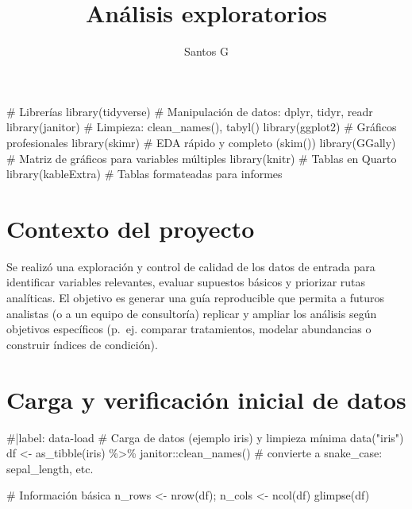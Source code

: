 \documentclass[
  spanish,
  11pt,
  a4paper,
  DIV=11,
  numbers=noendperiod]{scrartcl}
\title{Análisis exploratorios}
\author{Santos G}
\date{}
\newenvironment{Shaded}{\begin{snugshade}}{\end{snugshade}}
\newcommand{\CommentTok}[1]{\textcolor[rgb]{0.37,0.37,0.37}{#1}}
\newcommand{\FunctionTok}[1]{\textcolor[rgb]{0.28,0.35,0.67}{#1}}
\newcommand{\NormalTok}[1]{\textcolor[rgb]{0.00,0.23,0.31}{#1}}
\newcommand{\OtherTok}[1]{\textcolor[rgb]{0.00,0.23,0.31}{#1}}
\newcommand{\SpecialCharTok}[1]{\textcolor[rgb]{0.37,0.37,0.37}{#1}}
\newcommand{\StringTok}[1]{\textcolor[rgb]{0.13,0.47,0.30}{#1}}
\renewcommand*\contentsname{Tabla de contenidos}
\newcommand\contentsname{Tabla de contenidos}
\begin{document}
\maketitle

\renewcommand*\contentsname{Tabla de contenidos}
{
\hypersetup{linkcolor=}
\setcounter{tocdepth}{2}
\tableofcontents
}

\begin{Shaded}
\begin{Highlighting}[numbers=left,,]
\CommentTok{\# Librerías }
\FunctionTok{library}\NormalTok{(tidyverse)   }\CommentTok{\# Manipulación de datos: dplyr, tidyr, readr}
\FunctionTok{library}\NormalTok{(janitor)     }\CommentTok{\# Limpieza: clean\_names(), tabyl()}
\FunctionTok{library}\NormalTok{(ggplot2)     }\CommentTok{\# Gráficos profesionales}
\FunctionTok{library}\NormalTok{(skimr)       }\CommentTok{\# EDA rápido y completo (skim())}
\FunctionTok{library}\NormalTok{(GGally)      }\CommentTok{\# Matriz de gráficos para variables múltiples}
\FunctionTok{library}\NormalTok{(knitr)       }\CommentTok{\# Tablas en Quarto}
\FunctionTok{library}\NormalTok{(kableExtra)  }\CommentTok{\# Tablas formateadas para informes}
\end{Highlighting}
\end{Shaded}

\section{Contexto del proyecto}\label{contexto-del-proyecto}

Se realizó una exploración y control de calidad de los datos de entrada
para identificar variables relevantes, evaluar supuestos básicos y
priorizar rutas analíticas. El objetivo es generar una guía reproducible
que permita a futuros analistas (o a un equipo de consultoría) replicar
y ampliar los análisis según objetivos específicos (p.~ej. comparar
tratamientos, modelar abundancias o construir índices de condición).

\section{Carga y verificación inicial de
datos}\label{carga-y-verificaciuxf3n-inicial-de-datos}

\begin{Shaded}
\begin{Highlighting}[numbers=left,,]
\CommentTok{\#|label: data{-}load}
\CommentTok{\# Carga de datos (ejemplo iris) y limpieza mínima}
\FunctionTok{data}\NormalTok{(}\StringTok{"iris"}\NormalTok{)}
\NormalTok{df }\OtherTok{\textless{}{-}} \FunctionTok{as\_tibble}\NormalTok{(iris) }\SpecialCharTok{\%\textgreater{}\%} 
\NormalTok{  janitor}\SpecialCharTok{::}\FunctionTok{clean\_names}\NormalTok{()   }\CommentTok{\# convierte a snake\_case: sepal\_length, etc.}

\CommentTok{\# Información básica}
\NormalTok{n\_rows }\OtherTok{\textless{}{-}} \FunctionTok{nrow}\NormalTok{(df); n\_cols }\OtherTok{\textless{}{-}} \FunctionTok{ncol}\NormalTok{(df)}
\FunctionTok{glimpse}\NormalTok{(df)}
\end{Highlighting}
\end{Shaded}
\end{document}
